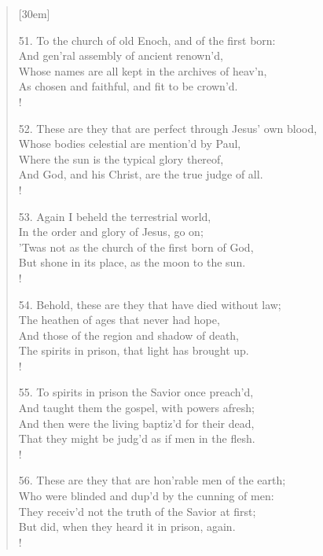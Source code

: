\begin{verse}[30em]
\begin{altverse}
				51. To the church of old Enoch, and of the first born: \\ 
				And gen'ral assembly of ancient renown'd, \\ 
				Whose names are all kept in the archives of heav'n, \\ 
				As chosen and faithful, and fit to be crown'd. \\!
				 
				52. These are they that are perfect through Jesus' own blood, \\ 
				Whose bodies celestial are mention'd by Paul, \\ 
				Where the sun is the typical glory thereof, \\ 
				And God, and his Christ, are the true judge of all. \\!
				 
				53. Again I beheld the terrestrial world, \\ 
				In the order and glory of Jesus, go on; \\ 
				'Twas not as the church of the first born of God, \\ 
				But shone in its place, as the moon to the sun. \\!
				 
				54. Behold, these are they that have died without law; \\ 
				The heathen of ages that never had hope, \\ 
				And those of the region and shadow of death, \\ 
				The spirits in prison, that light has brought up. \\!
				 
				55. To spirits in prison the Savior once preach'd, \\ 
				And taught them the gospel, with powers afresh; \\ 
				And then were the living baptiz'd for their dead, \\ 
				That they might be judg'd as if men in the flesh. \\!
				 
				56. These are they that are hon'rable men of the earth; \\ 
				Who were blinded and dup'd by the cunning of men: \\ 
				They receiv'd not the truth of the Savior at first; \\ 
				But did, when they heard it in prison, again. \\!
				 

\end{altverse}
\end{verse}
